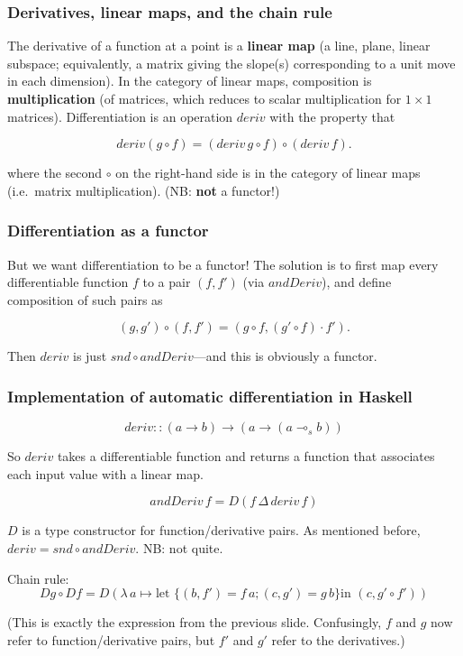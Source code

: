 \documentclass[10pt]{beamer}
\newcommand{\lamf}[2]{\ensuremath{\lambda\, #1 \mapsto #2}}
\newcommand{\delprod}[2]{\ensuremath{#1\,\Delta\,#2}}
\theoremstyle{definition}
\theoremstyle{remark}
\numberwithin{equation}{section}
\begin{document}
\begin{frame}[fragile]
  \frametitle{Derivatives, linear maps, and the chain rule}
  
  The derivative of a function at a point is a \textbf{linear map} (a line,
  plane, linear subspace; equivalently, a matrix giving the slope(s)
  corresponding to a unit move in each dimension). In the category of linear
  maps, composition is \textbf{multiplication} (of matrices, which reduces to
  scalar multiplication for $1 \times 1$ matrices). Differentiation is an operation
  $deriv$ with the property that

  \[
    deriv(g \circ f) = (deriv\, g \circ f) \circ (deriv\, f).
  \]

  where the second $\circ$ on the right-hand side is in the category of linear maps
  (i.e.\ matrix multiplication). {\small (NB: \textbf{not} a functor!)}
  
\end{frame}

\begin{frame}[fragile]
  \frametitle{Differentiation as a functor}

  But we want differentiation to be a functor! The solution is to first map
  every differentiable function $f$ to a pair $(f,f')$ (via $andDeriv$), and
  define composition of such pairs as

  \[
    (g,g') \circ (f,f') = (g \circ f, (g' \circ f) \cdot f').
  \]

  Then $deriv$ is just $snd \circ andDeriv$---and this is obviously a functor.
  
\end{frame}

\begin{frame}[fragile]
  \frametitle{Implementation of automatic differentiation in Haskell}

  \[
    deriv :: (a \rightarrow b) \rightarrow (a \rightarrow (a \multimap_s b))
  \]

  So $deriv$ takes a differentiable function and returns a function that
  associates each input value with a linear map.

  \[
    andDeriv\,f = D (\delprod{f}{deriv\, f})
  \]

  $D$ is a type constructor for function/derivative pairs. As mentioned before,
  $deriv = snd \circ andDeriv$. {\small NB: not quite.}

  Chain rule:
  \[
    Dg \circ Df = D (\lamf{a}{\text{let } \{(b, f') = f\,a; (c,g') = g\,b\} \text{
        in }
    (c, g' \circ f')})
\]

(This is exactly the expression from the previous slide. Confusingly, $f$ and
$g$ now refer to function/derivative pairs, but $f'$ and $g'$ refer to the
derivatives.)
\end{frame}
\end{document}
